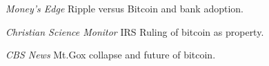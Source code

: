 \documentclass[11pt]{article}
\renewcommand{\section}[1]{\pagebreak[3]%
    \hyphenpenalty=10000%
    \vspace{1.3\baselineskip}%
    \phantomsection\addcontentsline{toc}{section}{#1}%
    \noindent\llap{\scshape\smash{\parbox[t]{\marginparwidth}{\raggedright #1}}}%
    \vspace{-\baselineskip}\par}
\newenvironment{innerlist}[1][\enskip\textbullet]%
        {\begin{itemize}[#1,leftmargin=*,parsep=0pt,itemsep=0pt,topsep=0pt,partopsep=0pt]}
        {\end{itemize}}
\newenvironment{loneinnerlist}[1][\enskip\textbullet]%
        {\begin{itemize}[#1,leftmargin=10pt,parsep=0pt,itemsep=0pt,topsep=0pt,partopsep=0pt]}
        {\end{itemize}\vspace{-.6\baselineskip}}
\begin{document}
\textit{Money's Edge} Ripple versus Bitcoin and bank adoption. %


\textit{Christian Science Monitor} IRS Ruling of bitcoin as property. %


\textit{CBS News} Mt.Gox collapse and future of bitcoin. %
%
%
%
%





\end{document}
